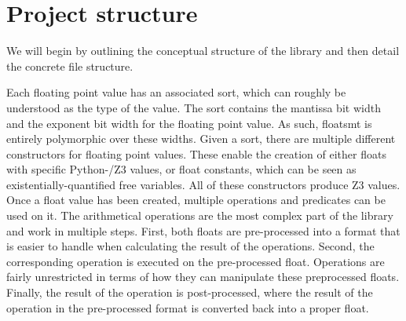 \documentclass[a4paper,UKenglish,cleveref, autoref, thm-restate]{lipics-v2019}
\begin{document}
\section{Project structure}
We will begin by outlining the conceptual structure of the library and then detail the concrete file structure. 

Each floating point value has an associated sort, which can roughly be understood as the type of the value. The sort contains the mantissa bit width and the exponent bit width for the floating point value. As such, floatsmt is entirely polymorphic over these widths. 
Given a sort, there are multiple different constructors for floating point values. These enable the creation of either floats with specific Python-/Z3 values, or float constants, which can be seen as existentially-quantified free variables. All of these constructors produce Z3 values.
Once a float value has been created, multiple operations and predicates can be used on it. The arithmetical operations are the most complex part of the library and work in multiple steps. First, both floats are pre-processed into a format that is easier to handle when calculating the result of the operations. Second, the corresponding operation is executed on the pre-processed float. Operations are fairly unrestricted in terms of how they can manipulate these preprocessed floats. Finally, the result of the operation is post-processed, where the result of the operation in the pre-processed format is converted back into a proper float.
\end{document}
